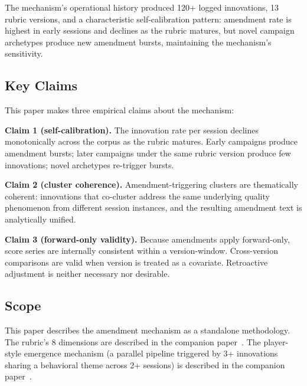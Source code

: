 The mechanism's operational history produced 120+ logged innovations, 13 rubric
versions, and a characteristic self-calibration pattern: amendment rate is highest in
early sessions and declines as the rubric matures, but novel campaign archetypes
produce new amendment bursts, maintaining the mechanism's sensitivity.

\subsection{Key Claims}

This paper makes three empirical claims about the mechanism:

\textbf{Claim 1 (self-calibration).} The innovation rate per session declines
monotonically across the corpus as the rubric matures. Early campaigns produce
amendment bursts; later campaigns under the same rubric version produce few
innovations; novel archetypes re-trigger bursts.

\textbf{Claim 2 (cluster coherence).} Amendment-triggering clusters are thematically
coherent: innovations that co-cluster address the same underlying quality phenomenon
from different session instances, and the resulting amendment text is analytically
unified.

\textbf{Claim 3 (forward-only validity).} Because amendments apply forward-only,
score series are internally consistent within a version-window. Cross-version
comparisons are valid when version is treated as a covariate. Retroactive adjustment
is neither necessary nor desirable.

\subsection{Scope}

This paper describes the amendment mechanism as a standalone methodology. The rubric's
8 dimensions are described in the companion paper~\cite{dellalibera2026glyph1}. The
player-style emergence mechanism (a parallel pipeline triggered by 3+ innovations
sharing a behavioral theme across 2+ sessions) is described in the companion
paper~\cite{dellalibera2026glyph4}.
